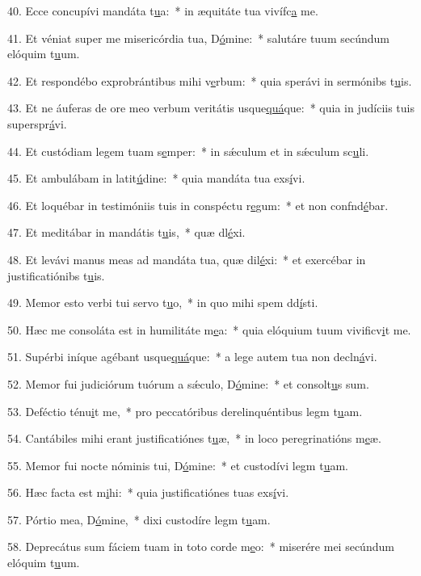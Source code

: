40. Ecce concupívi mandáta t\uline{u}a:~* in æquitáte tua vivífc\uline{a} me.\par 
41. Et véniat super me misericórdia tua, D\uline{ó}mine:~* salutáre tuum secúndum elóquim t\uline{u}um.\par 
42. Et respondébo exprobrántibus mihi v\uline{e}rbum:~* quia sperávi in sermónibs t\uline{u}is.\par 
43. Et ne áuferas de ore meo verbum veritátis usque\uline{quá}que:~* quia in judíciis tuis superspr\uline{á}vi.\par 
44. Et custódiam legem tuam s\uline{e}mper:~* in sǽculum et in sǽculum sc\uline{u}li.\par 
45. Et ambulábam in latit\uline{ú}dine:~* quia mandáta tua exs\uline{í}vi.\par 
46. Et loquébar in testimóniis tuis in conspéctu r\uline{e}gum:~* et non confnd\uline{é}bar.\par 
47. Et meditábar in mandátis t\uline{u}is,~* quæ dl\uline{é}xi.\par 
48. Et levávi manus meas ad mandáta tua, quæ dil\uline{é}xi:~* et exercébar in justificatiónibs t\uline{u}is.\par 
49. Memor esto verbi tui servo t\uline{u}o,~* in quo mihi spem dd\uline{í}sti.\par 
50. Hæc me consoláta est in humilitáte m\uline{e}a:~* quia elóquium tuum vivificv\uline{i}t me.\par 
51. Supérbi iníque agébant usque\uline{quá}que:~* a lege autem tua non decln\uline{á}vi.\par 
52. Memor fui judiciórum tuórum a sǽculo, D\uline{ó}mine:~* et consolt\uline{u}s sum.\par 
53. Deféctio ténu\uline{i}t me,~* pro peccatóribus derelinquéntibus legm t\uline{u}am.\par 
54. Cantábiles mihi erant justificatiónes t\uline{u}æ,~* in loco peregrinatións m\uline{e}æ.\par 
55. Memor fui nocte nóminis tui, D\uline{ó}mine:~* et custodívi legm t\uline{u}am.\par 
56. Hæc facta est m\uline{i}hi:~* quia justificatiónes tuas exs\uline{í}vi.\par 
57. Pórtio mea, D\uline{ó}mine,~* dixi custodíre legm t\uline{u}am.\par 
58. Deprecátus sum fáciem tuam in toto corde m\uline{e}o:~* miserére mei secúndum elóquim t\uline{u}um.\par 
